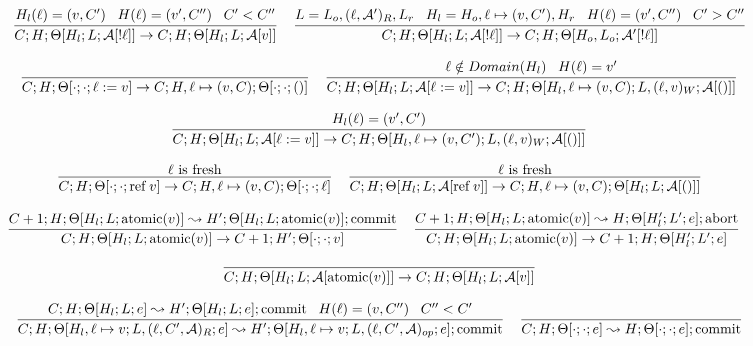 \documentclass[9pt]{article}
\newcommand{\aeval}[1]{\mathcal{A}[#1]}
\newcommand{\actxt}[0]{\mathcal{A}}
\newcommand{\loc}[0]{\ell}
\newcommand{\atomic}[1]{\text{atomic}(#1)}
\newcommand{\alloc}[1]{\text{ref} \; #1}
\newcommand{\commit}[0]{\text{commit}}
\newcommand{\abort}[0]{\text{abort}}
\begin{document}
\[%
\infer[]{C; H; \Theta[H_l; L; \aeval{!\loc}] \rightarrow C; H; \Theta[H_l; L; \aeval{v}]}{H_l(\loc) = (v, C') \;\;\; H(\loc) = (v', C'') \;\;\; C' < C''} \;\;\;
\infer[]{C; H; \Theta[H_l; L; \aeval{!\loc}] \rightarrow C; H; \Theta[H_o, L_o; \actxt'[!\loc]]}{L = L_o, (\loc, \actxt')_R, L_r \;\;\; H_l = H_o, \loc \mapsto (v, C'), H_r \;\;\; H(\loc) = (v', C'') \;\;\; C' > C''} 
\]

\[%
\infer[]{C; H; \Theta[\cdot; \cdot; \loc := v] \rightarrow C; H, \loc \mapsto (v, C); \Theta[\cdot; \cdot; ()]}{}\;\;\;
\infer[]{C; H; \Theta[H_l; L; \aeval{\loc := v}] \rightarrow C; H; \Theta[H_l, \loc \mapsto (v, C); L, (\loc, v)_W; \aeval{()}]}{\loc \notin Domain(H_l) \;\;\; H(\loc) = v'} 
\]

\[%
\infer[]{C; H; \Theta[H_l; L; \aeval{\loc := v}] \rightarrow C; H; \Theta[H_l, \loc \mapsto (v, C'); L, (\loc,v)_W; \aeval{()}]}{H_l(\loc) = (v', C')} 
\]

\[%
\infer[]{C; H; \Theta[\cdot; \cdot; \alloc{v}] \rightarrow C; H, \loc \mapsto (v, C); \Theta[\cdot; \cdot; \loc]}{\loc \text{ is fresh}} \;\;\;
\infer[]{C; H; \Theta[H_l; L; \aeval{\alloc{v}}] \rightarrow C; H, \loc \mapsto (v, C); \Theta[H_l; L;  \aeval{()}]}{\loc \text{ is fresh}}
\]

\[%
\infer[]{C; H; \Theta[H_l; L; \atomic{v}] \rightarrow C+1; H'; \Theta[\cdot;\cdot; v]}{C+1; H; \Theta[H_l; L; \atomic{v}] \leadsto H'; \Theta[H_l; L; \atomic{v}]; \commit} \;\;\;
\infer[]{C; H; \Theta[H_l; L; \atomic{v}] \rightarrow C+1; H; \Theta[H_l'; L'; e]}{C+1; H; \Theta[H_l; L; \atomic{v}] \leadsto H; \Theta[H_l'; L'; e]; \abort} \;\;\;
\]

\[%
\infer[]{C; H; \Theta[H_l; L; \aeval{\atomic{v}}] \rightarrow C; H; \Theta[H_l; L; \aeval{v}]}{}
\]

\boxed{C; H; \Theta[H_l; L; e] \leadsto H', \Theta[H_l'; L'; e']; (\abort | \commit)}

\[%
\infer[]{C; H; \Theta[H_l, \loc \mapsto v; L, (\loc,C', \actxt)_R; e] \leadsto H'; \Theta[H_l, \loc \mapsto v; L, (\loc, C', \actxt)_{op};e]; \commit}{C; H; \Theta[H_l; L; e] \leadsto H'; \Theta[H_l; L; e]; \commit \;\;\; H(\loc) = (v, C'') \;\;\; C'' < C'} \;\;\;
\infer[]{C;H;\Theta[\cdot;\cdot;e] \leadsto H; \Theta[\cdot;\cdot;e]; \commit}{}
\]
\end{document}
